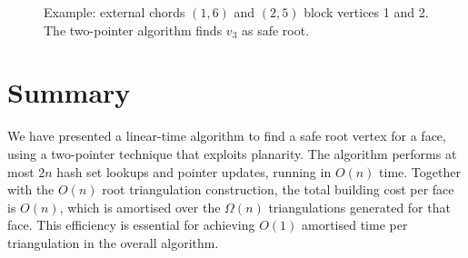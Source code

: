 \begin{figure}[htbp]
    \centering
    \caption{Example: external chords $(1,6)$ and $(2,5)$ block vertices 1 and 2. 
    The two-pointer algorithm finds $v_3$ as safe root.}
    \label{fig:example_safe_root}
\end{figure}

\section{Summary}
\label{sec:safe_root_summary}

We have presented a linear-time algorithm to find a safe root vertex for a face, using a two-pointer technique that exploits planarity. 
The algorithm performs at most $2n$ hash set lookups and pointer updates, running in $O(n)$ time. 
Together with the $O(n)$ root triangulation construction, the total building cost per face is $O(n)$, which is amortised over the $\Omega(n)$ triangulations generated for that face. 
This efficiency is essential for achieving $O(1)$ amortised time per triangulation in the overall algorithm.